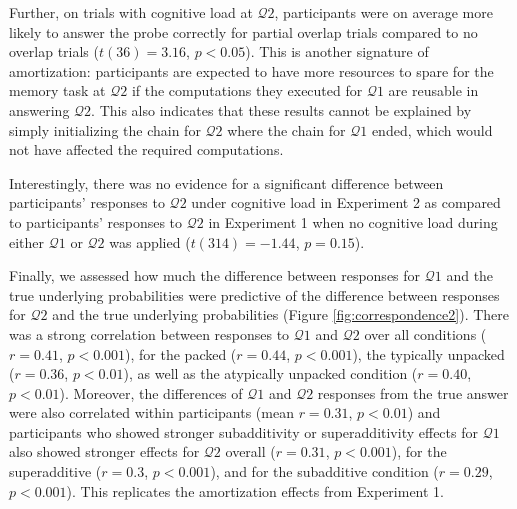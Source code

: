 Further, on trials with cognitive load at $\mathcal{Q}2$, participants were on average more likely to answer the probe correctly for partial overlap trials compared to no overlap trials ($t(36)=3.16$, $p<0.05$). This is another signature of amortization: participants are expected to have more resources to spare for the memory task at $\mathcal{Q}2$ if the computations they executed for $\mathcal{Q}1$ are reusable in answering $\mathcal{Q}2$. This also indicates that these results cannot be explained by simply initializing the chain for $\mathcal{Q}2$ where the chain for $\mathcal{Q}1$ ended, which would not have affected the required computations. 

Interestingly, there was no evidence for a significant difference between participants' responses to $\mathcal{Q}2$ under cognitive load in Experiment 2 as compared to participants' responses to $\mathcal{Q}2$ in Experiment 1 when no cognitive load during either $\mathcal{Q}1$ or $\mathcal{Q}2$ was applied ($t(314)=-1.44$, $p= 0.15$).

Finally, we assessed how much the difference between responses for $\mathcal{Q}1$ and the true underlying probabilities were predictive of the difference between responses for $\mathcal{Q}2$ and the true underlying probabilities (Figure \ref{fig:correspondence2}). There was a strong correlation between responses to $\mathcal{Q}1$ and $\mathcal{Q}2$ over all conditions ($r=0.41$, $p<0.001$), for the packed ($r=0.44$, $p<0.001$), the typically unpacked ($r=0.36$, $p<0.01$), as well as the atypically unpacked condition ($r=0.40$, $p<0.01$). Moreover, the differences of $\mathcal{Q}1$ and $\mathcal{Q}2$ responses from the true answer were also correlated within participants (mean $r=0.31$, $p<0.01$) and participants who showed stronger subadditivity or superadditivity effects for $\mathcal{Q}1$ also showed stronger effects for $\mathcal{Q}2$ overall ($r=0.31$, $p<0.001$), for the superadditive ($r=0.3$, $p<0.001$), and for the subadditive condition ($r=0.29$, $p<0.001$). This replicates the amortization effects from Experiment 1.

